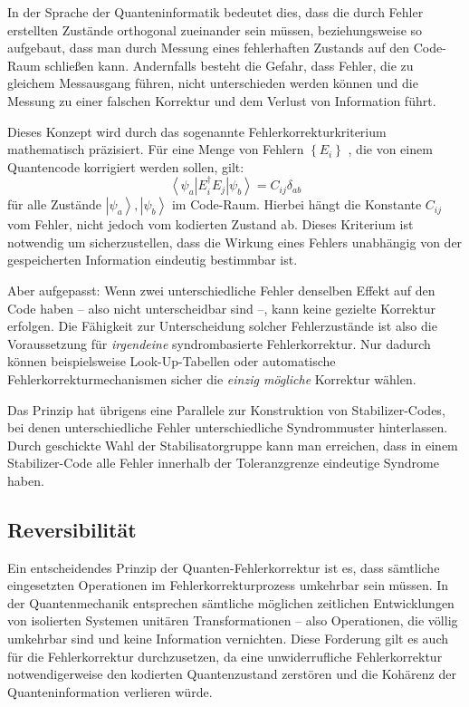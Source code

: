 In der Sprache der Quanteninformatik bedeutet dies, dass die durch Fehler erstellten Zustände orthogonal zueinander sein müssen, beziehungsweise so aufgebaut, dass man durch Messung eines fehlerhaften Zustands auf den Code-Raum schließen kann. Andernfalls besteht die Gefahr, dass Fehler, die zu gleichem Messausgang führen, nicht unterschieden werden können und die Messung zu einer falschen Korrektur und dem Verlust von Information führt. \cite[Seite 449–451]{nielsen_michael_a_and_isaac_l_chuang_quantum_2010}

Dieses Konzept wird durch das sogenannte Fehlerkorrekturkriterium mathematisch präzisiert. Für eine Menge von Fehlern \(\left\{E_{i}\right\}\) , die von einem Quantencode korrigiert werden sollen, gilt:
\begin{equation}
    \left\langle\psi_{a}\right| E_{i}^{\dagger} E_{j}\left|\psi_{b}\right\rangle=C_{i j} \delta_{a b}
\end{equation}
für alle Zustände \(
    \left|\psi_{a}\right\rangle,\left|\psi_{b}\right\rangle
\)  im Code-Raum. Hierbei hängt die Konstante \(
    C_{i j}
\) vom Fehler,  nicht jedoch vom kodierten Zustand ab. Dieses Kriterium ist notwendig um sicherzustellen, dass die Wirkung eines Fehlers unabhängig von der gespeicherten Information eindeutig bestimmbar ist.

Aber aufgepasst: Wenn zwei unterschiedliche Fehler denselben Effekt auf den Code haben – also nicht unterscheidbar sind –, kann keine gezielte Korrektur erfolgen. Die Fähigkeit zur Unterscheidung solcher Fehlerzustände ist also die Voraussetzung für \textit{irgendeine} syndrombasierte Fehlerkorrektur. Nur dadurch können beispielsweise Look-Up-Tabellen oder automatische Fehlerkorrekturmechanismen sicher die \textit{einzig mögliche} Korrektur wählen.

Das Prinzip hat übrigens eine Parallele zur Konstruktion von Stabilizer-Codes, bei denen unterschiedliche Fehler unterschiedliche Syndrommuster hinterlassen. Durch geschickte Wahl der Stabilisatorgruppe kann man erreichen, dass in einem Stabilizer-Code alle Fehler innerhalb der Toleranzgrenze eindeutige Syndrome haben. \cite{gottesmann Stabilizer Codes}

\subsection{Reversibilität}
Ein entscheidendes Prinzip der Quanten-Fehlerkorrektur ist es, dass sämtliche eingesetzten Operationen im Fehlerkorrekturprozess umkehrbar sein müssen. In der Quantenmechanik entsprechen sämtliche möglichen zeitlichen Entwicklungen von isolierten Systemen unitären Transformationen – also Operationen, die völlig umkehrbar sind und keine Information vernichten. Diese Forderung gilt es auch für die Fehlerkorrektur durchzusetzen, da eine unwiderrufliche Fehlerkorrektur notwendigerweise den kodierten Quantenzustand zerstören und die Kohärenz der Quanteninformation verlieren würde. \cite[Seite 450-451]{nielsen_michael_a_and_isaac_l_chuang_quantum_2010}

